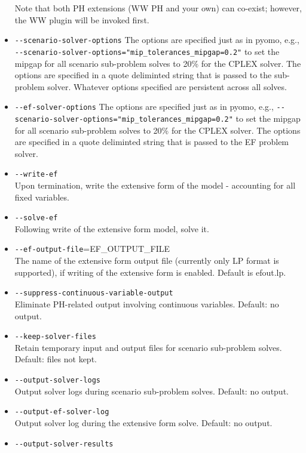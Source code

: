 \begin{itemize}
Note that both PH extensions (WW PH and your own) can co-exist; however, the WW plugin will be invoked first.
 
\item \verb|--scenario-solver-options| The options are specified just as in pyomo, e.g., \verb|--scenario-solver-options="mip_tolerances_mipgap=0.2"| to set the mipgap for all scenario sub-problem solves to 20\% for the CPLEX solver. The options are specified in a quote deliminted string that is passed to the sub-problem solver.
 Whatever options specified are persistent across all solves.  
\item \verb|--ef-solver-options| The options are specified just as in pyomo, e.g., \verb|--scenario-solver-options="mip_tolerances_mipgap=0.2"| to set the mipgap for all scenario sub-problem solves to 20\% for the CPLEX solver. The options are specified in a quote deliminted string that is passed to the EF problem solver.
  \item \verb|--write-ef|\\            Upon termination, write the extensive form of the model - accounting for all fixed variables.
  \item \verb|--solve-ef|\\            Following write of the extensive form model, solve it.
  \item \verb|--ef-output-file|=EF\_OUTPUT\_FILE\\
                        The name of the extensive form output file (currently only LP format is supported), if writing of the extensive form is enabled. Default is efout.lp.
  \item \verb|--suppress-continuous-variable-output|\\
                        Eliminate PH-related output involving continuous variables. Default: no output.
  \item \verb|--keep-solver-files|\\   Retain temporary input and output files for scenario sub-problem solves.  Default: files not kept.
  \item \verb|--output-solver-logs|\\  Output solver logs during scenario sub-problem solves. Default: no output.
  \item \verb|--output-ef-solver-log|\\
                        Output solver log during the extensive form solve. Default: no output.
  \item \verb|--output-solver-results|\\

\end{itemize}
